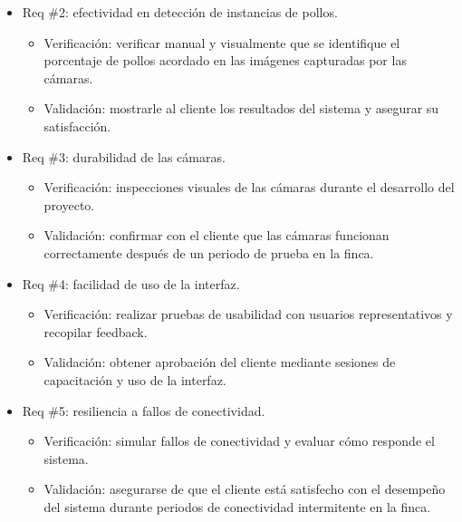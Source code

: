 \documentclass[
11pt, %
]{charter}
\begin{document}
\begin{itemize} 
\item Req \#2: efectividad en detección de instancias de pollos.
	\begin{itemize}
	\item Verificación: verificar manual y visualmente que se identifique el porcentaje de pollos acordado en las imágenes capturadas por las cámaras.
	\item Validación: mostrarle al cliente los resultados del sistema y asegurar su satisfacción.
	\end{itemize}
\end{itemize}

\begin{itemize} 
\item Req \#3: durabilidad de las cámaras.
	\begin{itemize}
	\item Verificación: inspecciones visuales de las cámaras durante el desarrollo del proyecto.
	\item Validación: confirmar con el cliente que las cámaras funcionan correctamente después de un periodo de prueba en la finca.
	\end{itemize}
\end{itemize}

\begin{itemize} 
\item Req \#4: facilidad de uso de la interfaz.
	\begin{itemize}
	\item Verificación: realizar pruebas de usabilidad con usuarios representativos y recopilar feedback.
	\item Validación: obtener aprobación del cliente mediante sesiones de capacitación y uso de la interfaz.
	\end{itemize}
\end{itemize}

\begin{itemize} 
\item Req \#5: resiliencia a fallos de conectividad.
	\begin{itemize}
	\item Verificación: simular fallos de conectividad y evaluar cómo responde el sistema.
	\item Validación: asegurarse de que el cliente está satisfecho con el desempeño del sistema durante periodos de conectividad intermitente en la finca.
	\end{itemize}
\end{itemize}
\end{document}
